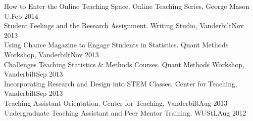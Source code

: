How to Enter the Online Teaching Space. Online Teaching Series, George Mason U.\hfill{Feb 2014}\smallskip\\
Student Feelings and the Research Assignment. Writing Studio, Vanderbilt\hfill{Nov 2013}\smallskip\\
Using Chance Magazine to Engage Students in Statistics. Quant Methods Workshop, Vanderbilt\hfill{Nov 2013}\smallskip\\
Challenges Teaching Statistics \& Methods Courses. Quant Methods Workshop, Vanderbilt\hfill{Sep 2013}\smallskip\\
Incorporating Research and Design into STEM Classes. Center for Teaching, Vanderbilt\hfill{Sep 2013}\smallskip\\
Teaching Assistant Orientation. Center for Teaching, Vanderbilt\hfill{Aug 2013}\smallskip\\
Undergraduate Teaching Assistant and Peer Mentor Training. WUStL\hfill{Aug 2012}